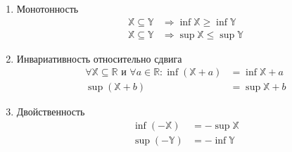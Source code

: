 \documentclass[class=article,a4paper,12pt,crop=false]{standalone}
\begin{document}
\begin{enumerate}
  \item {
    Монотонность
    \begin{equation}
      \begin{aligned}
        \mathbb{X} \subseteq \mathbb{Y} & \Rightarrow \inf{\mathbb{X}} \geq \inf{\mathbb{Y}} \\
        \mathbb{X} \subseteq \mathbb{Y} & \Rightarrow \sup{\mathbb{X}} \leq \sup{\mathbb{Y}}
      \end{aligned}
    \end{equation}
  }
  \item {
    Инвариативность относительно сдвига
    \begin{equation}
      \begin{aligned}
        \forall \mathbb{X} \subseteq \mathbb{R} \text{ и } \forall a \in \mathbb{R}: \inf{(\mathbb{X} + a)} & = \inf{\mathbb{X}} + a\\
         \sup{(\mathbb{X} + b)} & = \sup{\mathbb{X}} + b
      \end{aligned}
    \end{equation}
  }
  \item {
    Двойственность
    \begin{equation}
      \begin{aligned}
        \inf{(-\mathbb{X})} & = -\sup{\mathbb{X}} \\
        \sup{(-\mathbb{Y})} & = -\inf{\mathbb{Y}}
      \end{aligned}
    \end{equation}
  }
\end{enumerate}
\end{document}
